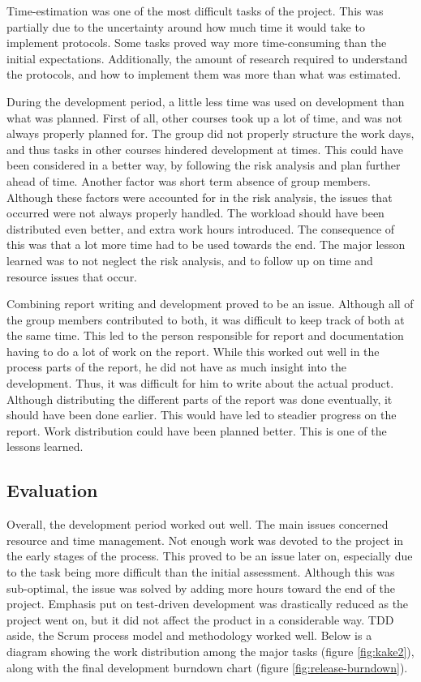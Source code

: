 Time-estimation was one of the most difficult tasks of the project. This was partially due to the uncertainty around how much time it would take to implement protocols. Some tasks proved way more time-consuming than the initial expectations. Additionally, the amount of research required to understand the protocols, and how to implement them was more than what was estimated.

During the development period, a little less time was used on development than what was planned. First of all, other courses took up a lot of time, and was not always properly planned for. The group did not properly structure the work days, and thus tasks in other courses hindered development at times. This could have been considered in a better way, by following the risk analysis and plan further ahead of time. Another factor was short term absence of group members. Although these factors were accounted for in the risk analysis, the issues that occurred were not always properly handled. The workload should have been distributed even better, and extra work hours introduced. The consequence of this was that a lot more time had to be used towards the end. The major lesson learned was to not neglect the risk analysis, and to follow up on time and resource issues that occur.

Combining report writing and development proved to be an issue. Although all of the group members contributed to both, it was difficult to keep track of both at the same time. This led to the person responsible for report and documentation having to do a lot of work on the report. While this worked out well in the process parts of the report, he did not have as much insight into the development. Thus, it was difficult for him to write about the actual product. Although distributing the different parts of the report was done eventually, it should have been done earlier. This would have led to steadier progress on the report. Work distribution could have been planned better. This is one of the lessons learned.

\subsection{Evaluation}
\label{subsec:project_evaluation-development-evaluation}

Overall, the development period worked out well. The main issues concerned resource and time management. Not enough work was devoted to the project in the early stages of the process. This proved to be an issue later on, especially due to the task being more difficult than the initial assessment. Although this was sub-optimal, the issue was solved by adding more hours toward the end of the project. Emphasis put on test-driven development was drastically reduced as the project went on, but it did not affect the product in a considerable way. TDD aside, the Scrum process model and methodology worked well. Below is a diagram showing the work distribution among the major tasks (figure \ref{fig:kake2}), along with the final development burndown chart (figure \ref{fig:release-burndown}).

